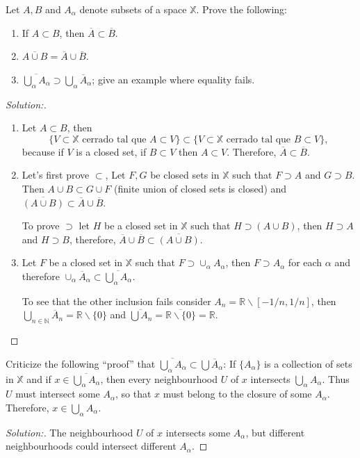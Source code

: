 \documentclass[a4paper,12pt, reqno]{article}
\theoremstyle{definition}
\newenvironment{exerr}[1]{
  \renewcommand\theexeralt{#1}
  \exeralt
}{\endexeralt}
\newenvironment{solution}{\begin{proof}[Solution:]}{\end{proof}}
\newcommand{\R}{\mathbb{R}}
\newcommand{\N}{\mathbb{N}}
\newcommand{\X}{\mathbb{X}}
\begin{document}
\begin{exerr}{6}
  Let $A,B$ and $A_{\alpha}$ denote subsets of a space $\X$. Prove the following:
  \begin{enumerate}[label=(\alph*)]
    \item If $A\subset B$, then $\overline{A}\subset \overline{B}$.
    \item $\overline{A\cup B} = \overline{A}\cup \overline{B}$.
    \item $\overline{\bigcup_{\alpha}A_{\alpha}}\supset\bigcup_{\alpha}\overline{A}_{\alpha}$; give an example where equality fails.
  \end{enumerate}
\end{exerr}
\begin{solution}\hfill
  \begin{enumerate}[label=(\alph*)]
    \item Let $A\subset B$, then
          \begin{equation*}
            \{ V\subset\X \text{ cerrado tal que }A\subset V \}\subset\{ V\subset\X \text{ cerrado tal que }B\subset V \},
          \end{equation*}
          because if $V$ is a closed set, if $B\subset V$ then $A\subset V$. Therefore, $\overline{A}\subset \overline{B}$.
    \item Let's first prove $\subset$, Let $F,G$ be closed sets in $\X$ such that $F\supset A$ and $G\supset B$. Then $A\cup B\subset G\cup F$ (finite union of closed sets is closed) and $\overline{(A\cup B)}\subset \overline{A}\cup \overline{B}$.

          To prove $\supset$ let $H$ be a closed set in $\X$ such that $H\supset (A\cup B)$, then $H\supset A$ and $H\supset B$, therefore, $\overline{A}\cup \overline{B}\subset \overline{(A\cup B)}$.
    \item Let $F$ be a closed set in $\X$ such that $F\supset\cup_{\alpha}A_{\alpha}$, then $F\supset A_{\alpha}$ for each $\alpha$ and therefore $\cup_{\alpha}\overline{A}_{\alpha}\subset \overline{\bigcup_{\alpha}A_{\alpha}}$.

          To see that the other inclusion fails consider $A_{n} = \R\backslash[-1/n,1/n]$, then $\bigcup_{n\in \N}\overline{A}_{n} = \R\backslash\{ 0 \}$ and $\overline{\bigcup A_{n}} = \overline{\R\backslash\{ 0 \}} = \R$.
  \end{enumerate}
\end{solution}

\begin{exerr}{7}
  Criticize the following ``proof'' that $\overline{\bigcup_{\alpha}A_{\alpha}}\subset\bigcup \overline{A}_{\alpha}$: If $\{ A_{\alpha} \}$ is a collection of sets in $\X$ and if $x\in\overline{\bigcup_{\alpha}A_{\alpha}}$, then every neighbourhood $U$ of $x$ intersects $\bigcup_{\alpha}A_{\alpha}$. Thus $U$ must intersect some $A_{\alpha}$, so that $x$ must belong to the closure of some $A_{\alpha}$. Therefore, $x\in\bigcup_{\alpha}A_{\alpha}$.
\end{exerr}
\begin{solution}
  The neighbourhood $U$ of $x$ intersects some $A_{\alpha}$, but different neighbourhoods could intersect different $A_{\alpha}$.
\end{solution}
\end{document}
